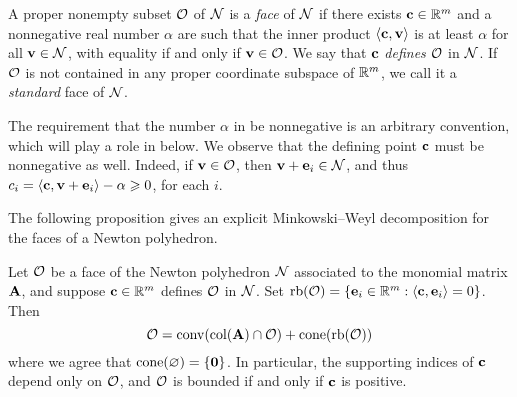 \documentclass{amsart}
\begin{document}
\begin{definition}[Face]
   \label{defn: face}
   A proper nonempty subset $\mathcal{O}$ of $\mathcal{N}$ is a \emph{face} of $\mathcal{N}$ if there exists $\mathbf{c} \in \mathbb{R}^m$ and a nonnegative real number $\alpha$ are such that the inner product $\langle \mathbf{c}, \mathbf{v} \rangle$ is at least $\alpha$ for all $\mathbf{v} \in \mathcal{N}$, with equality if and only if $\mathbf{v} \in \mathcal{O}$.
   We say that $\mathbf{c}$ \emph{defines} $\mathcal{O}$ in $\mathcal{N}$.
   If $\mathcal{O}$ is not contained in any proper coordinate subspace of $\mathbb{R}^m$, we call it a \emph{standard} face of $\mathcal{N}$.
\end{definition}

\begin{remark}
   \label{rmk: nonnegativity of defining point}
   The requirement that the number $\alpha$ in  be nonnegative is an arbitrary convention, which will play a role in  below.
   We observe that the defining point $\mathbf{c}$ must be nonnegative as well.
   Indeed, if $\mathbf{v} \in \mathcal{O}$, then $\mathbf{v} + \mathbf{e}_i \in \mathcal{N}$, and thus $c_i = \langle \mathbf{c}, \mathbf{v} + \mathbf{e}_i \rangle -\alpha \geqslant 0$, for each $i$.
\end{remark}

The following proposition gives an explicit Minkowski--Weyl decomposition for the faces of a Newton polyhedron.

\begin{proposition}
   \label{prop: MW for faces}
   Let $\mathcal{O}$ be a face of the Newton polyhedron $\mathcal{N}$ associated to the monomial matrix $\mathbf{A}$, and suppose $\mathbf{c} \in \mathbb{R}^m$ defines $\mathcal{O}$ in $\mathcal{N}$.
   Set $\operatorname{rb}(\mathcal{O}) =  \{ \mathbf{e}_i \in \mathbb{R}^m : \langle \mathbf{c}, \mathbf{e}_i \rangle = 0\}$.
   Then
   \[\mathcal{O} =  \operatorname{conv}( \operatorname{col}(\mathbf{A}) \cap \mathcal{O} ) + \operatorname{cone}(\operatorname{rb}(\mathcal{O}))\]
   where we agree that $\operatorname{cone}(\varnothing) = \{\mathbf{0}\}$.
   In particular, the supporting indices of $\mathbf{c}$ depend only on $\mathcal{O}$, and $\mathcal{O}$ is bounded if and only if $\mathbf{c}$ is positive.
\end{proposition}
\end{document}
